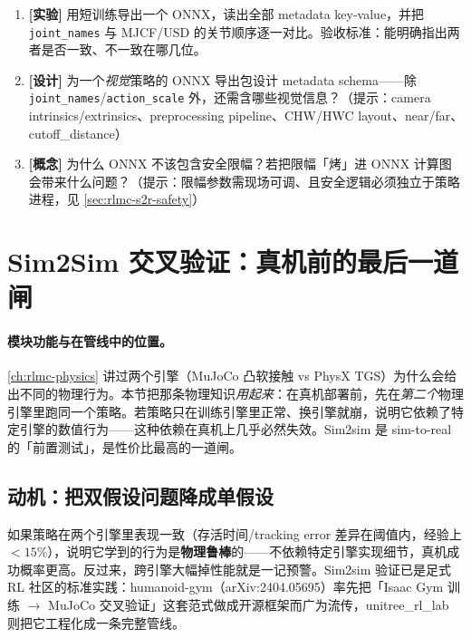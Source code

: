 \begin{practice}
\begin{enumerate}
  \item \textbf{[实验]} 用短训练导出一个 ONNX，读出全部 metadata key-value，并把 \verb|joint_names| 与 MJCF/USD 的关节顺序逐一对比。验收标准：能明确指出两者是否一致、不一致在哪几位。
  \item \textbf{[设计]} 为一个\emph{视觉}策略的 ONNX 导出包设计 metadata schema——除 \verb|joint_names|/\verb|action_scale| 外，还需含哪些视觉信息？（提示：camera intrinsics/extrinsics、preprocessing pipeline、CHW/HWC layout、near/far、cutoff\_distance）
  \item \textbf{[概念]} 为什么 ONNX 不该包含安全限幅？若把限幅「烤」进 ONNX 计算图会带来什么问题？（提示：限幅参数需现场可调、且安全逻辑必须独立于策略进程，见 \cref{sec:rlmc-s2r-safety}）
\end{enumerate}
\end{practice}

\section{Sim2Sim 交叉验证：真机前的最后一道闸}
\label{sec:rlmc-s2r-sim2sim}

\paragraph{模块功能与在管线中的位置。}\cref{ch:rlmc-physics} 讲过两个引擎（MuJoCo 凸软接触 vs PhysX TGS）为什么会给出不同的物理行为。本节把那条物理知识\emph{用起来}：在真机部署前，先在\emph{第二个}物理引擎里跑同一个策略。若策略只在训练引擎里正常、换引擎就崩，说明它依赖了特定引擎的数值行为——这种依赖在真机上几乎必然失效。Sim2sim 是 sim-to-real 的「前置测试」，是性价比最高的一道闸。

\subsection{动机：把双假设问题降成单假设}
\label{sec:rlmc-s2r-sim2sim-why}

如果策略在两个引擎里表现一致（存活时间/tracking error 差异在阈值内，经验上 $<15\%$），说明它学到的行为是\textbf{物理鲁棒}的——不依赖特定引擎实现细节，真机成功概率更高。反过来，跨引擎大幅掉性能就是一记预警。Sim2sim 验证已是足式 RL 社区的标准实践：humanoid-gym（arXiv:2404.05695）率先把「Isaac Gym 训练 $\to$ MuJoCo 交叉验证」这套范式做成开源框架而广为流传，unitree\_rl\_lab 则把它工程化成一条完整管线。

